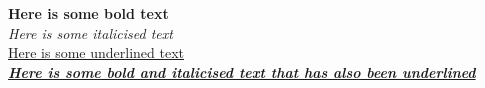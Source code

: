 \documentclass[10pt,a4paper]{article}
\begin{document}
\textbf{Here is some bold text}\\

\textit{Here is some italicised text}\\

\underline{Here is some underlined text}\\

\textbf{\textit{\underline{Here is some bold and italicised text that has also been underlined}}}
\end{document}
